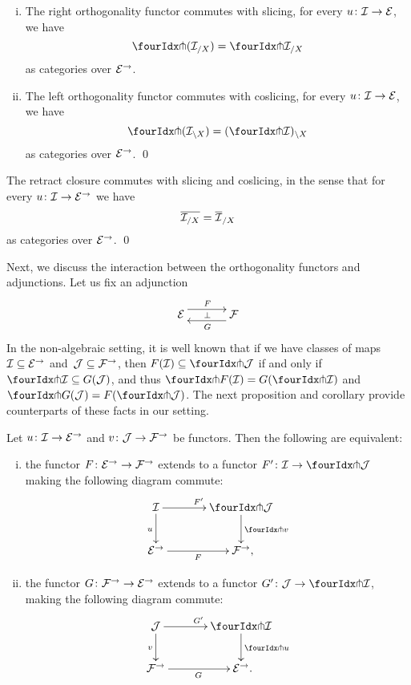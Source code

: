 \documentclass[reqno,10pt,a4paper,oneside,draft]{amsart}
\begin{document}
\begin{proposition} \label{pitchfork-slicing}
\hfill
\begin{enumerate}[(i)]
\item The right orthogonality functor commutes with slicing, \ie for every $u \co \cal{I} \to \cal{E}$, we have
\[
  \liftr{(\cal{I}_{/X})} = \liftr{\cal{I}}_{/X} 
\]
as categories over $\cal{E}^\to$.
\item The left orthogonality functor commutes with coslicing, \ie for every $u \co \cal{I} \to \cal{E}$, we have
\[
  \liftl{(\cal{I}_{\backslash X})} = (\liftl{\cal{I}})_{ \backslash X}
\]
as categories over $\cal{E}^\to$. \qed
\end{enumerate}
\end{proposition}



\begin{proposition} The retract closure commutes with slicing and coslicing, in the sense that for every $u \co \cal{I} \to \cal{E}^\to$ we have 
\[
\overline{\cal{I}_{/X}} = \overline{\cal{I}}_{/X}
\]
as categories over $\cal{E}^\to$. \qed
\end{proposition}




Next, we discuss the interaction between the orthogonality functors and adjunctions. Let us fix 
an adjunction
\[
\xymatrix@C+1em{
  \cal{E}
  \ar@<5pt>[r]^{F}
  \ar@{}[r]|{\bot}
&
  \cal{F}
  \ar@<5pt>[l]^{G}
}
\]
In the non-algebraic setting, it is well known that if we have classes of maps $\cal{I} \subseteq \cal{E}^\to$ and~$\cal{J} \subseteq \cal{F}^\to$, then $F(\cal{I}) \subseteq \liftl{\cal{J}}$ if and only if $\liftr{\cal{I}} \subseteq G(\cal{J})$, and thus $\liftr{F(\cal{I})} = G(\liftr{\cal{I}})$ and $\liftl{G(\cal{J})} = F(\liftl{\cal{J}})$. The next proposition and corollary provide counterparts of these facts in our setting.

\begin{proposition} \label{lift-of-adjunction}
Let $u \co \cal{I} \to \cal{E}^\to$ and $v \co \cal{J} \to \cal{F}^\to$ be functors. Then the following are equivalent:
\begin{enumerate}[(i)]
\item the functor $F \co \cal{E}^\to \to \cal{F}^\to$ extends to a functor $F' \co \cal{I} \to \liftl{\cal{J}}$ making the following diagram commute:
\[
\xymatrix@C=1.2cm{
  \cal{I}
  \ar[r]^{F'}
  \ar[d]_{u}
&
  \liftl{\cal{J}}
  \ar[d]^{\liftl{v}}
\\
  \cal{E}^\to
  \ar[r]_-{F}
&
  \cal{F}^\to
\rlap{,}}
\]
\item the functor $G \co \cal{F}^\to \to \cal{E}^\to$ extends to a functor $G' \co \cal{J} \to \liftr{\cal{I}}$, making the following diagram commute:
\[
\xymatrix@C=1.2cm{
  \cal{J}
    \ar[d]_{v}
\ar[r]^{G'}
& 
  \liftr{\cal{I}}
  \ar[d]^{\liftr{u}}
\\
  \cal{F}^\to
   \ar[r]_{G}
&
  \cal{E}^\to
\rlap{.}}
\]
\end{enumerate}
\end{proposition}
\end{document}
